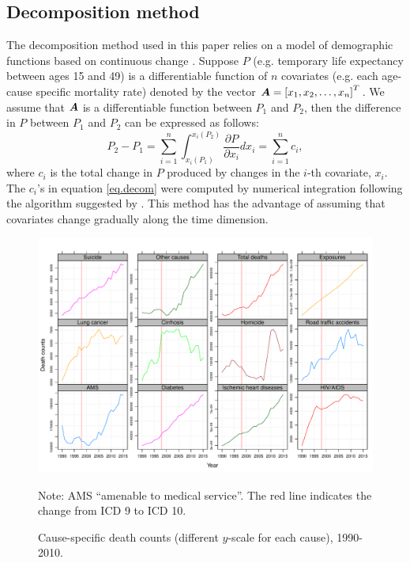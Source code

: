 \documentclass[11.5pt]{article}
\begin{document}
{\subsection*{Decomposition method}

The decomposition method used in this paper relies on a model of demographic functions based on continuous change \citep{horiuchi2008}. Suppose $P$ (e.g. temporary life expectancy between ages 15 and 49) is a differentiable function of $n$ covariates (e.g. each age-cause specific mortality rate) denoted by the vector $\boldsymbol{A} = \left[x_1,x_2,\ldots,x_n \right]^T$. We assume that $\boldsymbol{A}$ is a differentiable function between $P_1$ and $P_2$, then the difference in $P$ between $P_1$ and $P_2$ can be expressed as follows:
\begin{equation}
\label{eq.decom}
P_2-P_1 = \sum_{i = 1}^n \int_{x_i(P_1)}^{x_i(P_2)}\frac{\partial P}{\partial x_i}dx_i=\sum_{i = 1}^nc_i ,
\end{equation}
where $c_i$ is the total change in $P$ produced by changes in the $i$-th covariate, $x_i$. The $c_i$'s in equation \eqref{eq.decom} were computed by numerical integration following the algorithm suggested by \citet{horiuchi2008}. This method has the advantage of assuming that covariates change gradually along the time dimension.


\begin{figure}
\centering
\caption{Cause-specific death counts (different $y$-scale for each cause), 1990-2010.}
\label{fig:ClassSens}
\includegraphics[scale=.65]{Figures/Sensitivity_fig.pdf}

Note: AMS ``amenable to medical service''. The red line indicates the change from ICD 9 to ICD 10. 
\end{figure}


}
\end{document}
